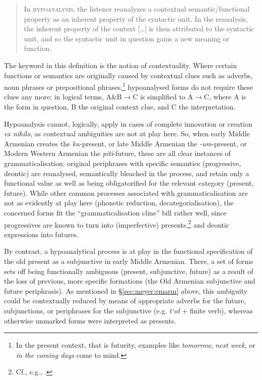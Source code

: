 \documentclass[output=paper,colorlinks,citecolor=brown]{langscibook}
\begin{document}
\begin{quote}
	In \textsc{hypoanalysis}, the listener reanalyzes a contextual semantic/functional property as an inherent property of the syntactic unit. In the reanalysis, the inherent property of the context […] is then attributed to the syntactic unit, and so the syntactic unit in question gains a new meaning or function.
\end{quote}

The keyword in this definition is the notion of contextuality. Where certain functions or semantics are originally caused by contextual clues such as adverbs, noun phrases or prepositional phrases,\footnote{In the present context, that is futurity, examples like \textit{tomorrow}, \textit{next week}, or \textit{in the coming days} come to mind.} hypoanalysed forms do not require these clues any more; in logical terms, A\&B$\rightarrow$C is simplified to A$\rightarrow$C, where A is the form in question, B the original context clue, and C the interpretation.

Hypoanalysis cannot, logically, apply in cases of complete innovation or creation \textit{ex nihilo}, as contextual ambiguities are not at play here. So, when early Middle Armenian creates the \textit{ku-}present, or late Middle Armenian the \textit{-um}-present, or Modern Western Armenian the \textit{piti}-future, these are all clear instances of grammaticalisation: original periphrases with specific semantics (progressive, deontic) are reanalysed, semantically bleached in the process, and retain only a functional value as well as being obligatorified for the relevant category (present, future). While other common processes associated with grammaticalisation are not as evidently at play here (phonetic reduction, decategorialisation), the concerned forms fit the ``grammaticalisation cline'' bill rather well, since progressives are known to turn into (imperfective) presents,\footnote{Cf., e.g., \citet{Deo2015}.} and deontic expressions into futures.

By contrast, a hypoanalytical process is at play in the functional specification of the old present as a subjunctive in early Middle Armenian. There, a set of forms sets off being functionally ambiguous (present, subjunctive, future) as a result of the loss of previous, more specific formations (the Old Armenian subjunctive and future periphrasis). As mentioned in §\ref{sec:meyer:emarm} above, this ambiguity could be contextually reduced by means of appropriate adverbs for the future, subjunctions, or periphrases for the subjunctive (e.g. \textit{t‘oł} + finite verb), whereas otherwise unmarked forms were interpreted as presents.
\end{document}

